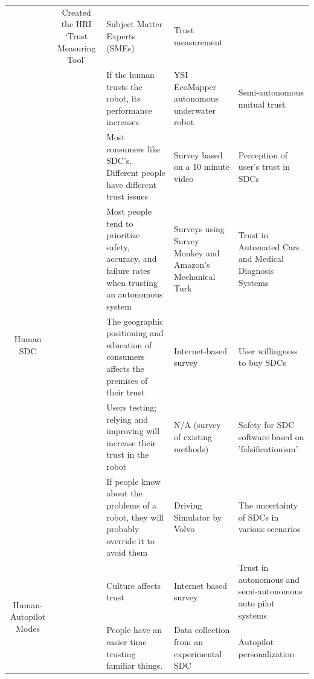 \documentclass[runningheads,a4paper]{llncs}
\begin{document}
\begin{center}
\begin{longtable}{|c|c|p{4cm}|p{2cm}|p{2cm}|}
	& Created the HRI `Trust Measuring Tool'
	& Subject Matter Experts (SMEs)                
	& Trust measurement
	\\ \cline{2-5} 
	& \cite{wang2014human}
	& If the human trusts the robot, its performance increases
	& YSI EcoMapper autonomous underwater robot         
	& Semi-autonomous mutual trust
	\\ \hline
\multirow{5}{*}{Human SDC}      
	& \cite{howard2014public}  
	& Most consumers like SDC's. Different people have different trust issues                     
	& Survey based on a 10 minute video                        
	& Perception of user's trust in SDCs
	\\ \cline{2-5} 
	& \cite{carlson2014identifying}
	& Most people tend to prioritize safety, accuracy, and failure rates when trusting an autonomous system                       
	& Surveys using  Survey Monkey and Amazon’s Mechanical Turk                  
	& Trust in Automated Cars and Medical Diagnosis Systems               
	\\ \cline{2-5} 
	& \cite{kyriakidis2015public}
	& The geographic positioning and education of consumers affects the premises of their trust 
	& Internet-based survey                    
	& User willingness to buy SDCs
	\\ \cline{2-5} 
	& \cite{wagner2015philosophy}    
	& Users testing; relying and improving will increase their trust in the robot 
	& N/A (survey of existing methods)         
	& Safety for SDC software based on 'falsificationism'
	\\ \cline{2-5} 
	& \cite{helldin2013presenting}
	& If people know about the problems of a robot, they will probably override it to avoid them            
	& Driving Simulator by Volvo  
	& The uncertainty of SDCs in various scenarios            
	\\ \hline
	
	\multirow{2}{*}{Human-Autopilot Modes}    
	& \cite{winter2015indian}
	& Culture affects trust                        
	& Internet based survey               
	& Trust in autonomous and semi-autonomous auto pilot systems        
	\\ \cline{2-5} 
	& \cite{butakov2015driving}
	& People have an easier time trusting familiar things.                   
	& Data collection from an experimental SDC
	& Autopilot personalization
	\\ \hline
	

\end{longtable}
\end{center}
\end{document}
